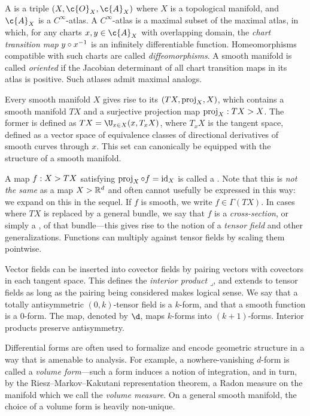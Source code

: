 \documentclass[11pt]{book}
\begin{document}
A  is a triple  $(X,\c{O}_X,\c{A}_X)$ where $X$ is a topological manifold, and $\c{A}_X$ is a $C^\infty$-atlas.
A $C^\infty$-atlas is a maximal subset of the maximal atlas, in which, for any charts $x,y \in \c{A}_X$ with overlapping domain, the \emph{chart transition map} $y\circ x^{-1}$ is an infinitely differentiable function.
Homeomorphisms compatible with such charts are called \emph{diffeomorphisms}.
A smooth manifold is called \emph{oriented} if the Jacobian determinant of all chart transition maps in its atlas is positive.
Such atlases admit maximal analogs.

Every smooth manifold $X$ gives rise to its  $(TX,\operatorname{proj}_X,X)$, which contains a smooth manifold $TX$ and a surjective projection map $\operatorname{proj}_X : TX \-> X$.
The former is defined as $TX = \U_{x\in X} (x,T_x X)$, where $T_x X$ is the tangent space, defined as a vector space of equivalence classes of directional derivatives of smooth curves through $x$.
This set can canonically be equipped with the structure of a smooth manifold.

A map $f : X \-> TX$ satisfying $\operatorname{proj}_X \circ f = \operatorname{id}_X$ is called a .
Note that this is \emph{not the same} as a map $X \-> \mathbb{R}^d$ and often cannot usefully be expressed in this way: we expand on this in the sequel.
If $f$ is smooth, we write $f \in \Gamma(TX)$.
In cases where $TX$ is replaced by a general bundle, we say that $f$ is a \emph{cross-section}, or simply a , of that bundle---this gives rise to the notion of a \emph{tensor field} and other generalizations.
Functions can multiply against tensor fields by scaling them pointwise.

Vector fields can be inserted into covector fields by pairing vectors with covectors in each tangent space.
This defines the \emph{interior product} $\mathbin{\lrcorner}$, and extends to tensor fields as long as the pairing being considered makes logical sense.
We say that a totally antisymmetric $(0,k)$-tensor field is a $k$-form, and that a smooth function is a $0$-form.
The  map, denoted by $\d$, maps $k$-forms into $(k+1)$-forms.
Interior products preserve antisymmetry.

Differential forms are often used to formalize and encode geometric structure in a way that is amenable to analysis.
For example, a nowhere-vanishing $d$-form is called a \emph{volume form}---such a form induces a notion of integration, and in turn, by the Riesz--Markov--Kakutani representation theorem, a Radon measure on the manifold which we call the \emph{volume measure}.
On a general smooth manifold, the choice of a volume form is heavily non-unique.
\end{document}
